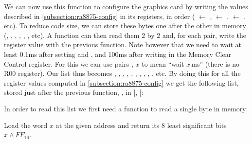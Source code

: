 
We can now use this function to configure the graphics card by writing the
values described in \cref{subsection:ra8875-config} in its registers, in order
( $\leftarrow$ ,
 $\leftarrow$ ,
 $\leftarrow$ , etc). To reduce
code size, we can store these bytes one after the other in memory
(, , , ,
, , etc). A function can then read them 2 by 2
and, for each pair, write the register value with the previous function. Note
however that we need to wait at least 0.1ms after setting
 and , and 100ms after writing in
the Memory Clear Control register. For this we can use pairs , $x$ to
mean ``wait $x\,$ms'' (there is no R00 register). Our list thus becomes
, , , ,
, , , ,
, , etc. By doing this for all the register
values computed in \cref{subsection:ra8875-config} we get the following list,
stored just after the previous function, \ie, in
[,
[:


In order to read this list we first need a function to read a single byte in
memory:

\begin{Paragraph}
\begin{paracol}{2}

Load the word $x$ at the given address and return its 8 least significant bits
$x \wedge \mathit{FF}_{16}$.

\end{paracol}
\end{Paragraph}

